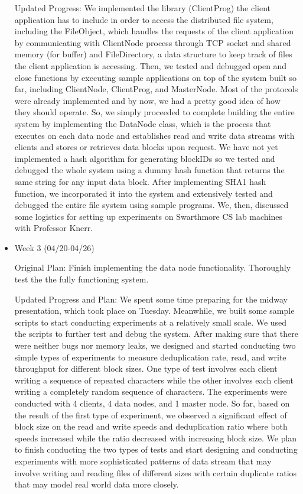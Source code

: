 \documentclass[11pt]{article}
\begin{document}
\begin{itemize}
Updated Progress: We implemented the library (ClientProg) the client application has to include in order to access the distributed file system, including the FileObject, which handles the requests of the client application by communicating with ClientNode process through TCP socket and shared memory (for buffer) and FileDirectory, a data structure to keep track of files the client application is accessing. Then, we tested and debugged open and close functions by executing sample applications on top of the system built so far, including ClientNode, ClientProg, and MasterNode. Most of the protocols were already implemented and by now, we had a pretty good idea of how they should operate. So, we simply proceeded to complete building the entire system by implementing the DataNode class, which is the process that executes on each data node and establishes read and write data streams with clients and stores or retrieves data blocks upon request. We have not yet implemented a hash algorithm for generating blockIDs so we tested and debugged the whole system using a dummy hash function that returns the same string for any input data block. After implementing SHA1 hash function, we incorporated it into the system and extensively tested and debugged the entire file system using sample programs. We, then, discussed some logistics for setting up experiments on Swarthmore CS lab machines with Professor Knerr.

  \item Week 3 (04/20-04/26)

Original Plan: Finish implementing the data node functionality. Thoroughly test the the fully functioning system.

Updated Progress and Plan: We spent some time preparing for the midway presentation, which took place on Tuesday. Meanwhile, we built some sample scripts to start conducting experiments at a relatively small scale. We used the scripts to further test and debug the system. After making sure that there were neither bugs nor memory leaks, we designed and started conducting two simple types of experiments to measure deduplication rate, read, and write throughput for different block sizes. One type of test involves each client writing a sequence of repeated characters while the other involves each client writing a completely random sequence of characters. The experiments were conducted with 4 clients, 4 data nodes, and 1 master node. So far, based on the result of the first type of experiment, we observed a significant effect of block size on the read and write speeds and deduplication ratio where both speeds increased while the ratio decreased with increasing block size. We plan to finish conducting the two types of tests and start designing and conducting experiments with more sophisticated patterns of data stream that may involve writing and reading files of different sizes with certain duplicate ratios that may model real world data more closely.


\end{itemize}
\end{document}
